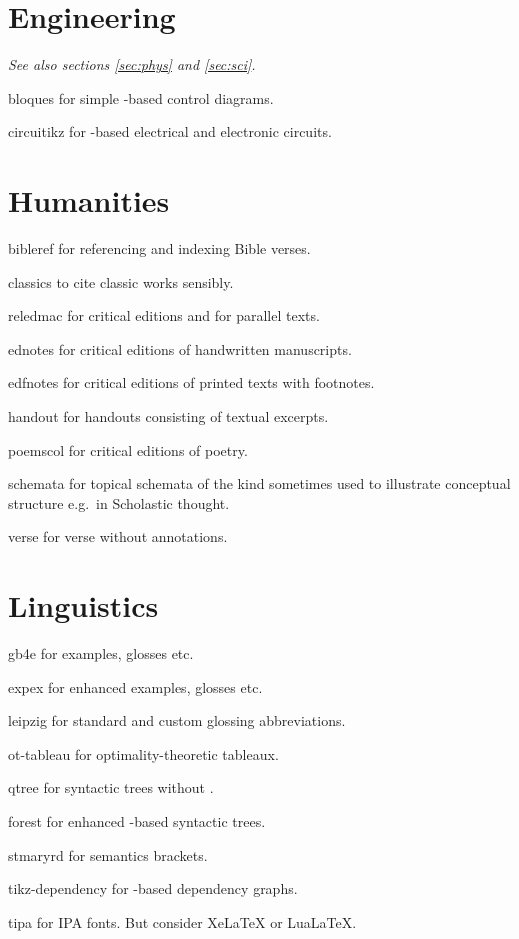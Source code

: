 \documentclass[a4paper,welsh,british,twocolumn]{article}
\begin{document}
\section{Engineering}\label{sec:eng}
\emph{See also sections \ref{sec:phys} and \ref{sec:sci}.}
\begin{pkgdescription}
  \item[bloques] for simple -based control diagrams.
  \item[circuitikz] for -based electrical and electronic circuits.
\end{pkgdescription}
\section{Humanities}
\begin{pkgdescription}
  \item[bibleref] for referencing and indexing Bible verses.
  \item[classics] to cite classic works sensibly.
  \item[reledmac] for critical editions and  for parallel texts.
  \item[ednotes] for critical editions of handwritten manuscripts.
  \item[edfnotes] for critical editions of printed texts with footnotes.
  \item[handout] for handouts consisting of textual excerpts.
  \item[poemscol] for critical editions of poetry.
  \item[schemata] for topical schemata of the kind sometimes used to illustrate conceptual structure e.g.~in Scholastic thought.
  \item[verse] for verse without annotations.
\end{pkgdescription}
\section{Linguistics}
\begin{pkgdescription}
  \item[gb4e] for examples, glosses etc.
  \item[expex] for enhanced examples, glosses etc.
  \item[leipzig] for standard and custom glossing abbreviations.
  \item[ot-tableau] for optimality-theoretic tableaux.
  \item[qtree] for syntactic trees without .
  \item[forest] for enhanced -based syntactic trees.
  \item[stmaryrd] for semantics brackets.
  \item[tikz-dependency] for -based dependency graphs.
  \item[tipa] for IPA fonts. But consider Xe\LaTeX{} or Lua\LaTeX.
\end{pkgdescription}
\end{document}
